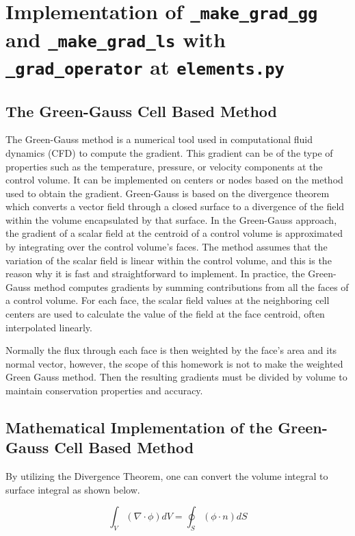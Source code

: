 \documentclass[a4paper, 12pt]{article}
\begin{document}
\section{Implementation of \texttt{\_make\_grad\_gg} and \texttt{\_make\_grad\_ls} with \\ \texttt{\_grad\_operator} at \texttt{elements.py}}
\subsection{The Green-Gauss Cell Based Method}
The Green-Gauss method is a numerical tool used in computational fluid dynamics (CFD) to compute the gradient. This gradient can be of the type of properties such as the temperature, pressure, or velocity components at the control volume. It can be implemented on centers or nodes based on the method used to obtain the gradient. Green-Gauss is based on the divergence theorem which converts a vector field through a closed surface to a divergence of the field within the volume encapsulated by that surface. In the Green-Gauss approach, the gradient of a scalar field at the centroid of a control volume is approximated by integrating over the control volume's faces. The method assumes that the variation of the scalar field is linear within the control volume, and this is the reason why it is fast and straightforward to implement. In practice, the Green-Gauss method computes gradients by summing contributions from all the faces of a control volume. For each face, the scalar field values at the neighboring cell centers are used to calculate the value of the field at the face centroid, often interpolated linearly. 
\\\par
Normally the flux through each face is then weighted by the face's area and its normal vector, however, the scope of this homework is not to make the weighted Green Gauss method. Then the resulting gradients must be divided by volume to maintain conservation properties and accuracy. 
\subsection{Mathematical Implementation of the Green-Gauss Cell Based Method}
By utilizing the Divergence Theorem, one can convert the volume integral to surface integral as shown below.

\begin{equation}
    \int_{V}^{}{(\nabla\cdot\phi)dV} = \oint_{S}^{}{(\phi\cdot n) dS}
\end{equation}
\end{document}
